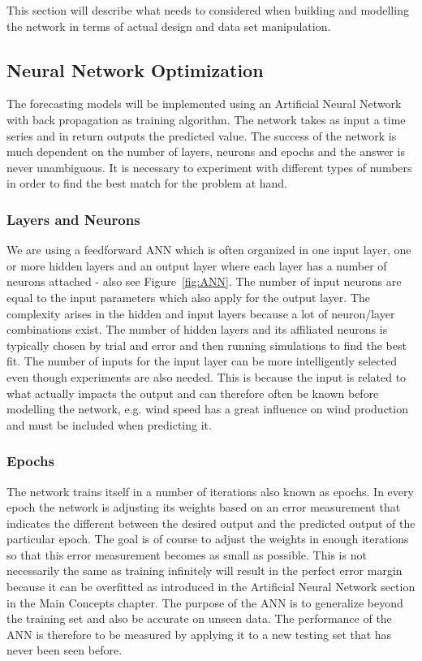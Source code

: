 This section will describe what needs to considered when building and modelling the network in terms of actual design and data set manipulation.

\subsection{Neural Network Optimization}
The forecasting models will be implemented using an Artificial Neural Network with back propagation as training algorithm. The network takes as input a time series and in return outputs the predicted value. The success of the network is much dependent on the number of layers, neurons and epochs and the answer is never unambiguous. It is necessary to experiment with different types of numbers in order to find the best match for the problem at hand.

\subsubsection{Layers and Neurons}
We are using a feedforward ANN which is often organized in one input layer, one or more hidden layers and an output layer where each layer has a number of neurons attached\cite{1} - also see Figure~\ref{fig:ANN}. The number of input neurons are equal to the input parameters which also apply for the output layer. 
The complexity arises in the hidden and input layers because a lot of neuron/layer combinations exist. The number of hidden layers and its affiliated neurons is typically chosen by trial and error and then running simulations to find the best fit\cite{1}. The number of inputs for the input layer can be more intelligently selected even though experiments are also needed. This is because the input is related to what actually impacts the output and can therefore often be known before modelling the network, e.g. wind speed has a great influence on wind production and must be included when predicting it.

\subsubsection{Epochs}
The network trains itself in a number of iterations also known as epochs. In every epoch the network is adjusting its weights based on an error measurement that indicates the different between the desired output and the predicted output of the particular epoch\cite{1}. The goal is of course to adjust the weights in enough iterations so that this error measurement becomes as small as possible. This is not necessarily the same as training infinitely will result in the perfect error margin because it can be overfitted as introduced in the Artificial Neural Network section in the Main Concepts chapter. The purpose of the ANN is to generalize beyond the training set and also be accurate on unseen data\cite{1}. The performance of the ANN is therefore to be measured by applying it to a new testing set that has never been seen before.

